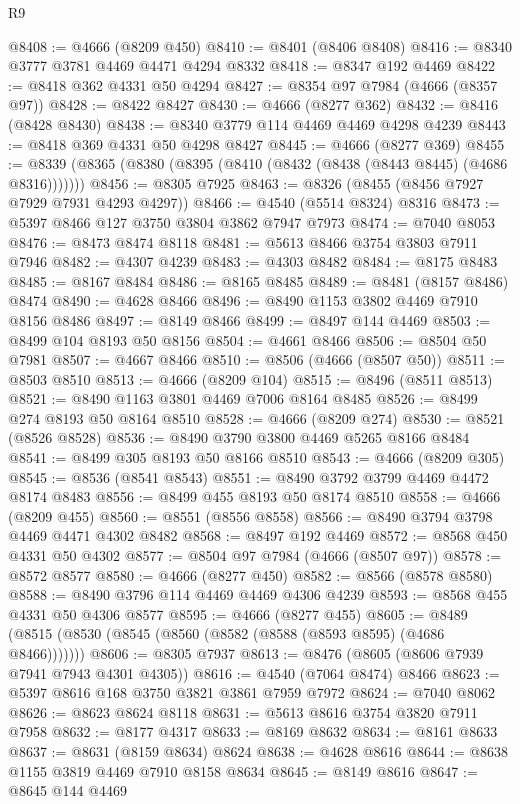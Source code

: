 \begin{lexlean}{R9}
\begin{coremodule}
@8408 := @4666 (@8209 @450)
@8410 := @8401 (@8406 @8408)
@8416 := @8340 @3777 @3781 @4469 @4471 @4294 @8332
@8418 := @8347 @192 @4469
@8422 := @8418 @362 @4331 @50 @4294
@8427 := @8354 @97 @7984 (@4666 (@8357 @97))
@8428 := @8422 @8427
@8430 := @4666 (@8277 @362)
@8432 := @8416 (@8428 @8430)
@8438 := @8340 @3779 @114 @4469 @4469 @4298 @4239
@8443 := @8418 @369 @4331 @50 @4298 @8427
@8445 := @4666 (@8277 @369)
@8455 := @8339 (@8365 (@8380 (@8395 (@8410 (@8432 (@8438 (@8443 @8445) (@4686 @8316)))))))
@8456 := @8305 @7925
@8463 := @8326 (@8455 (@8456 @7927 @7929 @7931 @4293 @4297))
@8466 := @4540 (@5514 @8324) @8316
@8473 := @5397 @8466 @127 @3750 @3804 @3862 @7947 @7973
@8474 := @7040 @8053
@8476 := @8473 @8474 @8118
@8481 := @5613 @8466 @3754 @3803 @7911 @7946
@8482 := @4307 @4239
@8483 := @4303 @8482
@8484 := @8175 @8483
@8485 := @8167 @8484
@8486 := @8165 @8485
@8489 := @8481 (@8157 @8486) @8474
@8490 := @4628 @8466
@8496 := @8490 @1153 @3802 @4469 @7910 @8156 @8486
@8497 := @8149 @8466
@8499 := @8497 @144 @4469
@8503 := @8499 @104 @8193 @50 @8156
@8504 := @4661 @8466
@8506 := @8504 @50 @7981
@8507 := @4667 @8466
@8510 := @8506 (@4666 (@8507 @50))
@8511 := @8503 @8510
@8513 := @4666 (@8209 @104)
@8515 := @8496 (@8511 @8513)
@8521 := @8490 @1163 @3801 @4469 @7006 @8164 @8485
@8526 := @8499 @274 @8193 @50 @8164 @8510
@8528 := @4666 (@8209 @274)
@8530 := @8521 (@8526 @8528)
@8536 := @8490 @3790 @3800 @4469 @5265 @8166 @8484
@8541 := @8499 @305 @8193 @50 @8166 @8510
@8543 := @4666 (@8209 @305)
@8545 := @8536 (@8541 @8543)
@8551 := @8490 @3792 @3799 @4469 @4472 @8174 @8483
@8556 := @8499 @455 @8193 @50 @8174 @8510
@8558 := @4666 (@8209 @455)
@8560 := @8551 (@8556 @8558)
@8566 := @8490 @3794 @3798 @4469 @4471 @4302 @8482
@8568 := @8497 @192 @4469
@8572 := @8568 @450 @4331 @50 @4302
@8577 := @8504 @97 @7984 (@4666 (@8507 @97))
@8578 := @8572 @8577
@8580 := @4666 (@8277 @450)
@8582 := @8566 (@8578 @8580)
@8588 := @8490 @3796 @114 @4469 @4469 @4306 @4239
@8593 := @8568 @455 @4331 @50 @4306 @8577
@8595 := @4666 (@8277 @455)
@8605 := @8489 (@8515 (@8530 (@8545 (@8560 (@8582 (@8588 (@8593 @8595) (@4686 @8466)))))))
@8606 := @8305 @7937
@8613 := @8476 (@8605 (@8606 @7939 @7941 @7943 @4301 @4305))
@8616 := @4540 (@7064 @8474) @8466
@8623 := @5397 @8616 @168 @3750 @3821 @3861 @7959 @7972
@8624 := @7040 @8062
@8626 := @8623 @8624 @8118
@8631 := @5613 @8616 @3754 @3820 @7911 @7958
@8632 := @8177 @4317
@8633 := @8169 @8632
@8634 := @8161 @8633
@8637 := @8631 (@8159 @8634) @8624
@8638 := @4628 @8616
@8644 := @8638 @1155 @3819 @4469 @7910 @8158 @8634
@8645 := @8149 @8616
@8647 := @8645 @144 @4469

\end{coremodule}
\end{lexlean}
